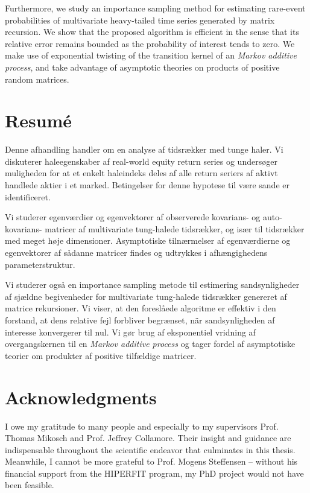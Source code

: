 Furthermore, we study an importance sampling method for estimating
rare-event probabilities of multivariate heavy-tailed time series
generated by matrix recursion. We show that the proposed algorithm is
efficient in the sense that its relative error remains bounded as the
probability of interest tends to zero. We make use of exponential
twisting of the transition kernel of an {\em Markov additive process},
and take advantage of asymptotic theories on products of positive
random matrices.

\section*{Resum{\'e}}
Denne afhandling handler om en analyse af tidsrækker med tunge
haler. Vi diskuterer haleegenskaber af real-world equity return series
og undersøger muligheden for at et enkelt haleindeks deles af alle
return seriers af aktivt handlede aktier i et marked. Betingelser for
denne hypotese til være sande er identificeret.

Vi studerer egenværdier og egenvektorer af observerede kovarians- og
auto-kovarians- matricer af multivariate tung-halede
tidsrækker, og især til tidsrækker med meget høje dimensioner.
Asymptotiske tilnærmelser af egenværdierne og egenvektorer af
sådanne matricer findes og udtrykkes i afhængighedens
parameterstruktur. 

Vi studerer også en importance sampling metode til estimering
sandsynligheder af sjældne begivenheder for multivariate tung-halede
tidsrækker genereret af matrice rekursioner. Vi viser, at den foreslåede
algoritme er effektiv i den forstand, at dens relative fejl forbliver
begrænset, när sandsynligheden af interesse konvergerer til nul. Vi gør
brug af eksponentiel vridning af overgangskernen til en {\em Markov
additive process} og tager fordel af asymptotiske teorier om produkter
af positive tilfældige matricer.
\newpage
\section*{Acknowledgments}
I owe my gratitude to many people and especially to my supervisors
Prof. Thomas Mikosch and Prof. Jeffrey Collamore. Their insight and
guidance are indispensable throughout the scientific endeavor that
culminates in this thesis. Meanwhile, I cannot be more grateful to
Prof. Mogens Steffensen -- without his financial
support from the HIPERFIT program, my PhD project would not have
been feasible.

